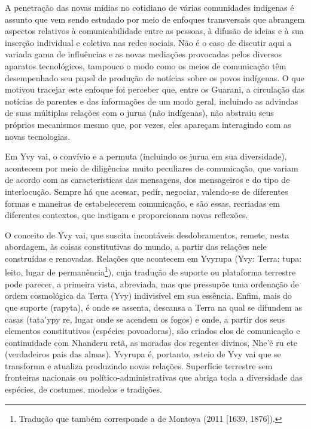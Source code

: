 {{A penetração das novas mídias no cotidiano de várias comunidades
indígenas é assunto que vem sendo estudado por meio de enfoques
transversais que abrangem aspectos relativos à comunicabilidade entre
as pessoas, à difusão de ideias e à sua inserção individual e coletiva
nas redes sociais. Não é o caso de discutir aqui a variada gama de
influências e as novas mediações provocadas pelos diversos aparatos
tecnológicos, tampouco o modo como os meios de comunicação têm
desempenhado seu papel de produção de notícias sobre os povos
indígenas. O que motivou tracejar este enfoque foi perceber que, entre
os Guarani, a circulação das notícias de parentes e das informações de
um modo geral, incluindo as advindas de suas múltiplas relações com o
jurua (não indígenas), não abstraiu seus próprios mecanismos mesmo que,
por vezes, eles apareçam interagindo com as novas tecnologias.

Em Yvy vai, o convívio e a permuta (incluindo os jurua em sua
diversidade), acontecem por meio de diligências muito peculiares de
comunicação, que variam de acordo com as características das mensagens,
dos mensageiros e do tipo de interlocução. Sempre há que acessar,
pedir, negociar, valendo-se de diferentes formas e maneiras de
estabelecerem comunicação, e são essas, recriadas em diferentes
contextos, que instigam e proporcionam novas reflexões. 

O conceito de Yvy vai, que suscita incontáveis desdobramentos, remete,
nesta abordagem, às coisas constitutivas do mundo, a partir das
relações nele construídas e renovadas. Relações que acontecem em
Yvyrupa (Yvy: Terra; tupa: leito, lugar de
permanência\footnote{Tradução que também corresponde a de Montoya (2011
[1639, 1876]). }), cuja tradução de suporte ou plataforma terrestre
pode parecer, a primeira vista, abreviada, mas que pressupõe uma
ordenação de ordem cosmológica da Terra (Yvy) indivisível em sua
essência. Enfim, mais do que suporte (rapyta), é onde se assenta,
descansa a Terra na qual se difundem as casas (tata’ypy re, lugar onde
se acendem os fogos) e onde, a partir dos seus elementos constitutivos
(espécies povoadoras), são criados elos de comunicação e continuidade
com Nhanderu retã, as moradas dos regentes divinos, Nhe’ẽ ru ete
(verdadeiros pais das almas). Yvyrupa é, portanto, esteio de Yvy vai
que se transforma e atualiza produzindo novas relações. Superfície
terrestre sem fronteiras nacionais ou político-administrativas que
abriga toda a diversidade das espécies, de costumes, modelos e
tradições. 

}}
